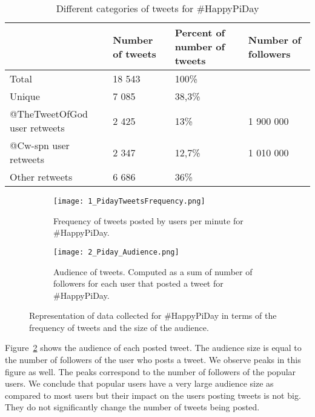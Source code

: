 \documentclass[journal, a4paper, 12pt]{article}
\begin{document}
    \begin{table}[!hbt]
            \begin{center}
            \caption{Different categories of tweets for \#HappyPiDay}
            \label{tab:numberoftweets_piday}
            \begin{tabular}{|p{4cm}|p{2cm}|p{2cm}|p{2cm}|}
                  \hline
                   & Number of tweets & Percent of number of tweets & Number of followers \\
            \hline
                  Total & 18 543 & 100\% & \\
                  \hline
                  Unique & 7 085  &  38,3\%  & \\
                  \hline
                  @TheTweetOfGod user retweets & 2 425 & 13\% & 1 900 000\\
            \hline
            @Cw-spn user retweets & 2 347 & 12,7\% & 1 010 000\\
                  \hline
            Other retweets & 6 686 & 36\% &\\
                  \hline
            \end{tabular}
            \end{center}
      \end{table}
    
    
    \begin{figure}[!hbt]
\begin{subfigure}{1\textwidth}
\texttt{[image: 1\_PidayTweetsFrequency.png]}
\caption{Frequency of tweets posted by users per minute for \#HappyPiDay.}
\label{fig:piday_freq_tweets}
\end{subfigure}
\begin{subfigure}{1\textwidth}
\texttt{[image: 2\_Piday\_Audience.png]}
\caption{Audience of tweets. Computed as a sum of number of followers for each user that posted a tweet for \#HappyPiDay.}
\label{fig:piday_audience}
\end{subfigure}
 
\caption{Representation of data collected for \#HappyPiDay in terms of the frequency of tweets and the size of the audience.}
\label{fig:piday_tweets_and_audience}
\end{figure}
   

Figure~\ref{fig:piday_audience} shows the audience of each posted tweet. The audience size is equal to the number of followers of the user who posts a tweet. We observe peaks in this figure as well. The peaks correspond to the number of followers of the popular users. We conclude that popular users have a very large audience size as compared to most users but their impact on the users posting tweets is not big. They do not significantly change the number of tweets being posted. 
\\
      
\end{document}
